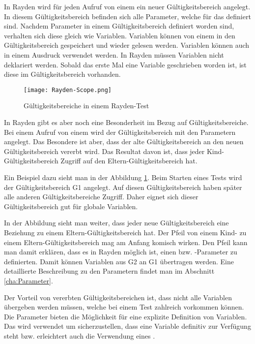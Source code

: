 In Rayden wird für jeden Aufruf von einem  ein neuer Gültigkeitsbereich angelegt. In diesem Gültigkeitsbereich befinden sich alle Parameter, welche für das  definiert sind. Nachdem Parameter in einem Gültigkeitsbereich definiert worden sind, verhalten sich diese gleich wie Variablen. Variablen können von einem  in den Gültigkeitsbereich gespeichert und wieder gelesen werden. Variablen können auch in einem Ausdruck verwendet werden. In Rayden müssen Variablen nicht deklariert werden. Sobald das erste Mal eine Variable geschrieben worden ist, ist diese im Gültigkeitsbereich vorhanden.

\begin{figure}[h]
\centering
\texttt{[image: Rayden-Scope.png]}
\caption{Gültigkeitsbereiche in einem Rayden-Test}
\label{fig:rayden-scope}
\end{figure}

\SuperPar
In Rayden gibt es aber noch eine Besonderheit im Bezug auf Gültigkeitsbereiche. Bei einem Aufruf von einem  wird der Gültigkeitsbereich mit den Parametern angelegt. Das Besondere ist aber, dass der alte Gültigkeitsbereich an den neuen Gültigkeitsbereich vererbt wird. Das Resultat davon ist, dass jeder Kind-Gültigkeitsbereich Zugriff auf den Eltern-Gültigkeitsbereich hat.

\SuperPar
Ein Beispiel dazu sieht man in der Abbildung \ref{fig:rayden-scope}. Beim Starten eines Tests wird der Gültigkeitsbereich G1 angelegt. Auf diesen Gültigkeitsbereich haben später alle anderen Gültigkeitsbereiche Zugriff. Daher eignet sich dieser Gültigkeitsbereich gut für globale Variablen.

\SuperPar
In der Abbildung sieht man weiter, dass jeder neue Gültigkeitsbereich eine Beziehung zu einem Eltern-Gültigkeitsbereich hat. Der Pfeil von einem Kind- zu einem Eltern-Gültigkeitsbereich mag am Anfang komisch wirken. Den Pfeil kann man damit erklären, dass es in Rayden möglich ist, einen  bzw. -Parameter zu definierten. Damit können Variablen aus G2 an G1 übertragen werden. Eine detaillierte Beschreibung zu den Parametern findet man im Abschnitt \ref{cha:Parameter}.

\SuperPar
Der Vorteil von vererbten Gültigkeitsbereichen ist, dass nicht alle Variablen übergeben werden müssen, welche bei einem Test zahlreich vorkommen können. Die Parameter bieten die Möglichkeit für eine explizite Definition von Variablen. Das wird verwendet um sicherzustellen, dass eine Variable definitiv zur Verfügung steht bzw. erleichtert auch die Verwendung eines .

